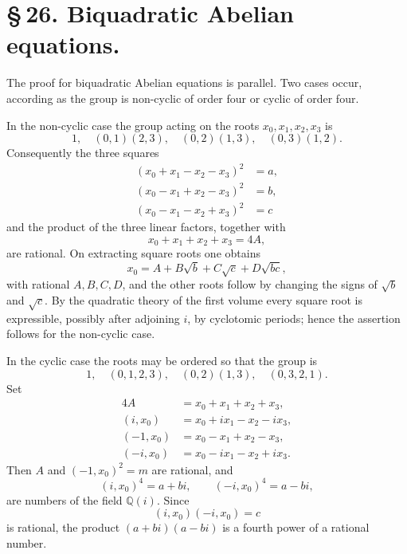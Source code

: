 \documentclass[11pt]{article}
\begin{document}
\section*{\S\,26. Biquadratic Abelian equations.}

The proof for biquadratic Abelian equations is parallel.  Two cases occur, according as the group is non-cyclic of order four or cyclic of order four.

In the non-cyclic case the group acting on the roots $x_0,x_1,x_2,x_3$ is
\begin{equation}
  1,
  \quad (0,1)(2,3),
  \quad (0,2)(1,3),
  \quad (0,3)(1,2).
  \tag{1}
\end{equation}
Consequently the three squares
\begin{equation}
\begin{aligned}
 (x_0+x_1-x_2-x_3)^2&=a,\\
 (x_0-x_1+x_2-x_3)^2&=b,\\
 (x_0-x_1-x_2+x_3)^2&=c
\end{aligned}
\tag{2}
\end{equation}
and the product of the three linear factors, together with
\begin{equation}
   x_0+x_1+x_2+x_3=4A,
   \tag{3}
\end{equation}
are rational.  On extracting square roots one obtains
\begin{equation}
   x_0=A+B\sqrt b+C\sqrt c+D\sqrt{bc},
   \tag{4}
\end{equation}
with rational $A,B,C,D$, and the other roots follow by changing the signs of $\sqrt b$ and $\sqrt c$.  By the quadratic theory of the first volume every square root is expressible, possibly after adjoining $i$, by cyclotomic periods; hence the assertion follows for the non-cyclic case.

In the cyclic case the roots may be ordered so that the group is
\begin{equation}
 1,
 \quad (0,1,2,3),
 \quad (0,2)(1,3),
 \quad (0,3,2,1).
 \tag{5}
\end{equation}
Set
\begin{equation}
\begin{aligned}
 4A&=x_0+x_1+x_2+x_3,\\
 (i,x_0)&=x_0+i x_1-x_2-i x_3,\\
 (-1,x_0)&=x_0-x_1+x_2-x_3,\\
 (-i,x_0)&=x_0-i x_1-x_2+i x_3.
\end{aligned}
\tag{6}
\end{equation}
Then $A$ and $(-1,x_0)^2=m$ are rational, and
\begin{equation}
  (i,x_0)^4=a+bi,
  \qquad
  (-i,x_0)^4=a-bi,
  \tag{7}
\end{equation}
are numbers of the field $\mathbb Q(i)$.  Since
\begin{equation}
   (i,x_0)(-i,x_0)=c
   \tag{8}
\end{equation}
is rational, the product $(a+bi)(a-bi)$ is a fourth power of a rational number.
\end{document}
